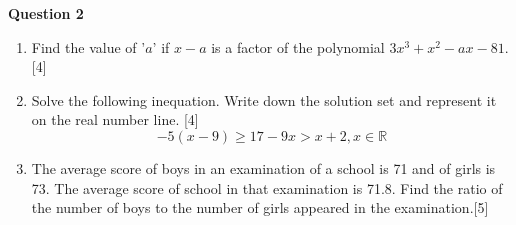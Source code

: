 \newpage
\vspace{5mm}
\par
\noindent
\textbf{Question 2}\\
\begin{enumerate}[label=(\roman*)]

    \item Find the value of '$a$' if $x-a$ is a factor of the polynomial 
          $3x^3 + x^2 - ax - 81$. \hfill [4]

    \item Solve the following inequation. Write down the solution set 
          and represent it on the real number line. \hfill [4]
          \[ -5(x-9) \geq 17 - 9x > x + 2, x \in \mathbb{R} \]

    \item The average score of boys in an examination of a school is 71
          and of girls is 73. The average score of school in that 
          examination is 71.8. Find the ratio of the number of boys
          to the number of girls appeared in the examination.\hfill [5]

\end{enumerate}
